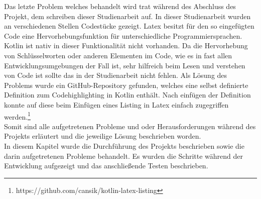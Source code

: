 Das letzte Problem welches behandelt wird trat während des Abschluss des Projekt, dem schreiben dieser Studienarbeit auf. In dieser Studienarbeit wurden an verschiedenen Stellen Codestücke gezeigt. Latex besitzt für den so eingefügten Code eine Hervorhebungsfunktion für unterschiedliche Programmiersprachen. Kotlin ist nativ in dieser Funktionalität nicht vorhanden. Da die Hervorhebung von Schlüsselworten oder anderen Elementen im Code, wie es in fast allen Entwicklungsumgebungen der Fall ist, sehr hilfreich beim Lesen und verstehen von Code ist sollte das in der Studienarbeit nicht fehlen. Als Lösung des Problems wurde ein GitHub-Repository gefunden, welches eine selbst definierte Definition zum Codehighlighting in Kotlin enthält. Nach einfügen der Definition konnte auf diese beim Einfügen eines Listing in Latex einfach zugegriffen werden.\footnote{https://github.com/cansik/kotlin-latex-listing}\\
Somit sind alle aufgetretenen Probleme und oder Herausforderungen während des Projekts erläutert und die jeweilige Lösung beschrieben worden.\\

In diesem Kapitel wurde die Durchführung des Projekts beschrieben sowie die darin aufgetretenen Probleme behandelt. Es wurden die Schritte während der Entwicklung aufgezeigt und das anschließende Testen beschrieben.